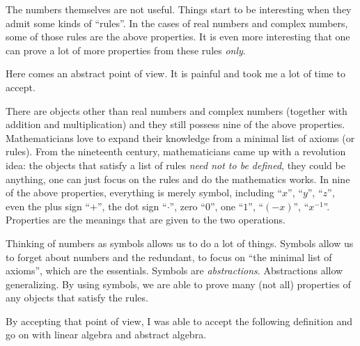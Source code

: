 \begin{note}
	The numbers themselves are not useful. Things start to be interesting when they admit some kinds of ``rules''. In the cases of real numbers and complex numbers, some of those rules are the above properties. It is even more interesting that one can prove a lot of more properties from these rules \textit{only}.

	Here comes an abstract point of view. It is painful and took me a lot of time to accept.

	There are objects other than real numbers and complex numbers (together with addition and multiplication) and they still possess nine of the above properties. Mathematicians love to expand their knowledge from a minimal list of axioms (or rules). From the nineteenth century, mathematicians came up with a revolution idea: the objects that satisfy a list of rules \textit{need not to be defined}, they could be anything, one can just focus on the rules and do the mathematics works. In nine of the above properties, everything is merely symbol, including ``$x$'', ``$y$'', ``$z$'', even the plus sign ``$+$'', the dot sign ``$\cdot$'', zero ``$0$'', one ``$1$'', ``$(-x)$'', ``$x^{-1}$''. Properties are the meanings that are given to the two operations.

	Thinking of numbers as symbols allows us to do a lot of things. Symbols allow us to forget about numbers and the redundant, to focus on ``the minimal list of axioms'', which are the essentials. Symbols are \textit{abstractions}. Abstractions allow generalizing. By using symbols, we are able to prove many (not all) properties of any objects that satisfy the rules.

	By accepting that point of view, I was able to accept the following definition and go on with linear algebra and abstract algebra.
\end{note}

